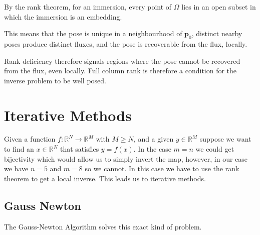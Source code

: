 \documentclass[12pt,a4paper]{report}
\theoremstyle{definition}
\begin{document}
By the rank theorem, for an immersion, every point of $\Omega$ lies in an open subset in which the immersion is an embedding.\cite{mckay2022}

This means that the pose is unique in a neighbourhood of $\mathbf{p}_0$, distinct nearby poses produce distinct fluxes, and the pose is recoverable from the flux, locally. 

Rank deficiency therefore signals regions where the pose cannot be recovered from the flux, even locally. Full column rank is therefore a condition for the inverse problem to be well posed.

\section{Iterative Methods}
Given a function $f : \mathbb{R}^N \rightarrow \mathbb{R}^M$ with $M \geq N$, and a given $y \in \mathbb{R}^M$ suppose we want to find an $x \in \mathbb{R}^N$ that satisfies $y = f(x)$. In the case $m = n$ we could get bijectivity which would allow us to simply invert the map, however, in our case we have $n = 5$ and $m = 8$ so we cannot. In this case we have to use the rank theorem to get a local inverse. This leads us to iterative methods.

\subsection{Gauss Newton}
The Gauss-Newton Algorithm solves this exact kind of problem. 
\end{document}
